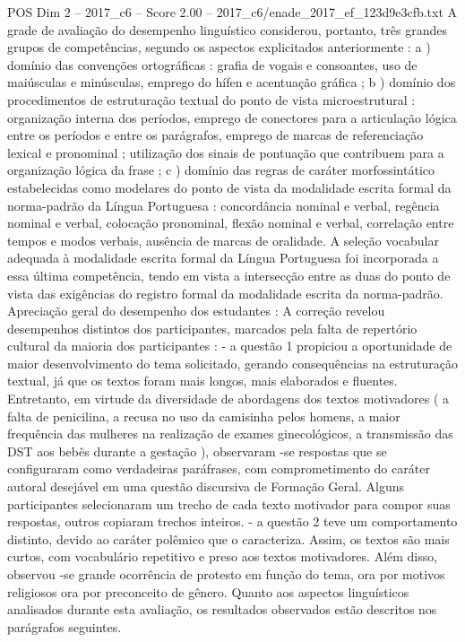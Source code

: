 \begin{textsample}{POS Dim 2 – 2017\_c6 – Score 2.00 – 2017\_c6/enade\_2017\_ef\_123d9e3cfb.txt}
A grade de avaliação do desempenho linguístico considerou, portanto, três grandes grupos de competências, segundo os aspectos explicitados anteriormente : a ) domínio das convenções ortográficas : grafia de vogais e consoantes, uso de maiúsculas e minúsculas, emprego do hífen e acentuação gráfica ; b ) domínio dos procedimentos de estruturação textual do ponto de vista microestrutural : organização interna dos períodos, emprego de conectores para a articulação lógica entre os períodos e entre os parágrafos, emprego de marcas de referenciação lexical e pronominal ; utilização dos sinais de pontuação que contribuem para a organização lógica da frase ; c ) domínio das regras de caráter morfossintático estabelecidas como modelares do ponto de vista da modalidade escrita formal da norma-padrão da Língua Portuguesa : concordância nominal e verbal, regência nominal e verbal, colocação pronominal, flexão nominal e verbal, correlação entre tempos e modos verbais, ausência de marcas de oralidade.
A seleção vocabular adequada à modalidade escrita formal da Língua Portuguesa foi incorporada a essa última competência, tendo em vista a intersecção entre as duas do ponto de vista das exigências do registro formal da modalidade escrita da norma-padrão.
Apreciação geral do desempenho dos estudantes : A correção revelou desempenhos distintos dos participantes, marcados pela falta de repertório cultural da maioria dos participantes : - a questão 1 propiciou a oportunidade de maior desenvolvimento do tema solicitado, gerando consequências na estruturação textual, já que os textos foram mais longos, mais elaborados e fluentes.
Entretanto, em virtude da diversidade de abordagens dos textos motivadores ( a falta de penicilina, a recusa no uso da camisinha pelos homens, a maior frequência das mulheres na realização de exames ginecológicos, a transmissão das DST aos bebês durante a gestação ), observaram -se respostas que se configuraram como verdadeiras paráfrases, com comprometimento do caráter autoral desejável em uma questão discursiva de Formação Geral.
Alguns participantes selecionaram um trecho de cada texto motivador para compor suas respostas, outros copiaram trechos inteiros. - a questão 2 teve um comportamento distinto, devido ao caráter polêmico que o caracteriza.
Assim, os textos são mais curtos, com vocabulário repetitivo e preso aos textos motivadores.
Além disso, observou -se grande ocorrência de protesto em função do tema, ora por motivos religiosos ora por preconceito de gênero.
Quanto aos aspectos linguísticos analisados durante esta avaliação, os resultados observados estão descritos nos parágrafos seguintes.

\end{textsample}

